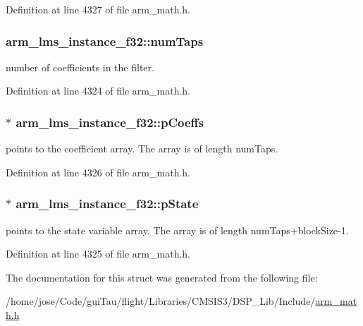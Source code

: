 Definition at line 4327 of file arm\-\_\-math.\-h.

\hypertarget{structarm__lms__instance__f32_af73880d9009982f5d14529869494ec3d}{
\subsubsection[{num\-Taps}]{ arm\-\_\-lms\-\_\-instance\-\_\-f32\-::num\-Taps}}\label{structarm__lms__instance__f32_af73880d9009982f5d14529869494ec3d}
number of coefficients in the filter. 

Definition at line 4324 of file arm\-\_\-math.\-h.

\hypertarget{structarm__lms__instance__f32_a4795c6f7d3f17cec15c2fd09f66edd1a}{
\subsubsection[{p\-Coeffs}]{$\ast$ arm\-\_\-lms\-\_\-instance\-\_\-f32\-::p\-Coeffs}}\label{structarm__lms__instance__f32_a4795c6f7d3f17cec15c2fd09f66edd1a}
points to the coefficient array. The array is of length num\-Taps. 

Definition at line 4326 of file arm\-\_\-math.\-h.

\hypertarget{structarm__lms__instance__f32_aaf94285be2f99b5b9af40bea8dcb14b9}{
\subsubsection[{p\-State}]{$\ast$ arm\-\_\-lms\-\_\-instance\-\_\-f32\-::p\-State}}\label{structarm__lms__instance__f32_aaf94285be2f99b5b9af40bea8dcb14b9}
points to the state variable array. The array is of length num\-Taps+block\-Size-\/1. 

Definition at line 4325 of file arm\-\_\-math.\-h.



The documentation for this struct was generated from the following file\-:\begin{DoxyCompactItemize}
\item 
/home/jose/\-Code/gui\-Tau/flight/\-Libraries/\-C\-M\-S\-I\-S3/\-D\-S\-P\-\_\-\-Lib/\-Include/\hyperlink{arm__math_8h}{arm\-\_\-math.\-h}\end{DoxyCompactItemize}

